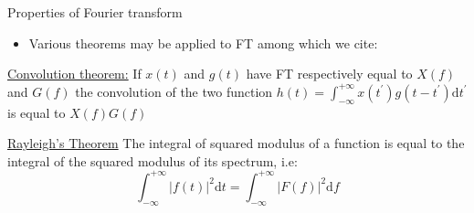 \documentclass[t,10pt]{beamer}
\begin{document}
\begin{frame}{Properties of Fourier transform}
\begin{itemize}
\item Various theorems may be applied to
  FT \parencite{Bracewell:1999ua} among which we cite:
\end{itemize}
\begin{theorem}{\underline{Convolution theorem:}}
If $x(t)$ and $g(t)$ have FT respectively equal to $X(f)$ and $G(f)$
the convolution of the two function $h(t) = \int_{-\infty}^{+\infty}x(t^{'})g(t-t^{'})\mathrm{d}t^{'}$
is equal to $X(f)G(f)$
\end{theorem}

\begin{theorem}{\underline{Rayleigh's Theorem}}
The integral of squared modulus of a function is equal to the
integral of the squared modulus of its spectrum, i.e:
\begin{equation*}
\int_{-\infty}^{+\infty}|f(t)|^2\mathrm{d}t =
\int_{-\infty}^{+\infty}|F(f)|^2\mathrm{d}f
\end{equation*}
\end{theorem}
\end{frame}
\end{document}
